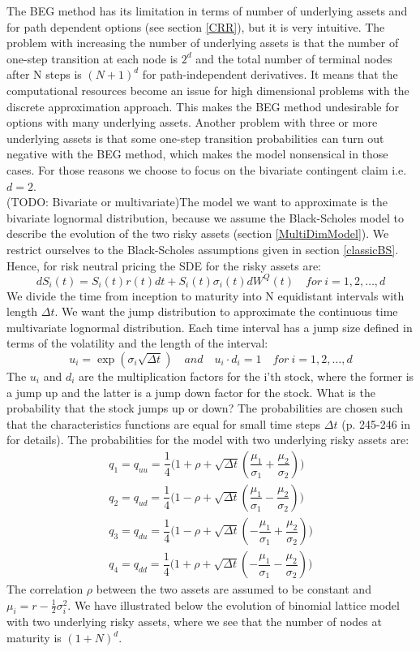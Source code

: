 The BEG method has its limitation in terms of number of underlying assets and for path dependent options (see section \ref{CRR}), but it is very intuitive. The problem with increasing the number of underlying assets is that the number of one-step transition at each node is $2^d$ and the total number of terminal nodes after N steps is $(N+1)^d$ for path-independent derivatives. It means that the computational resources become an issue for high dimensional problems with the discrete approximation approach. This makes the BEG method undesirable for options with many underlying assets. Another problem with three or more underlying assets is that some one-step transition probabilities can turn out negative with the BEG method, which makes the model nonsensical in those cases. For those reasons we choose to focus on the bivariate contingent claim i.e. $d=2$. \\

(TODO: Bivariate or multivariate)The model we want to approximate is the bivariate lognormal distribution, because we assume the Black-Scholes model to describe the evolution of the two risky assets (section \ref{MultiDimModel}). We restrict ourselves to the Black-Scholes assumptions given in section \ref{classicBS}. Hence, for risk neutral pricing the SDE for the risky assets are:
$$dS_i(t)=S_i(t)r(t)dt+S_i(t)\sigma_i(t)dW^Q(t) \quad for \ i=1,2,\ldots,d$$
We divide the time from inception to maturity into N equidistant intervals with length $\Delta t$. We want the jump distribution to approximate the continuous time multivariate lognormal distribution. Each time interval has a jump size defined in terms of the volatility and the length of the interval:
$$u_i=\exp(\sigma_i \sqrt{\Delta t}) \quad and \quad u_i \cdot d_i = 1 \quad for \ i=1,2,\ldots,d $$
The $u_i$ and $d_i$ are the multiplication factors for the i'th stock, where the former is a jump up and the latter is a jump down factor for the stock. What is the probability that the stock jumps up or down? The probabilities are chosen such that the characteristics functions are equal for small time steps $\Delta t$ (p. 245-246 in \parencite{BEG} for details). The probabilities for the model with two underlying risky assets are:
\begin{equation}
\begin{split}
q_1=q_{uu}=\dfrac{1}{4}\bigg( 1+\rho + \sqrt{\Delta t}(\dfrac{\mu_1}{\sigma_1} + \dfrac{\mu_2}{\sigma_2}) \bigg)\\
q_2=q_{ud}=\dfrac{1}{4}\bigg( 1-\rho + \sqrt{\Delta t}(\dfrac{\mu_1}{\sigma_1} - \dfrac{\mu_2}{\sigma_2}) \bigg)\\
q_3=q_{du}=\dfrac{1}{4}\bigg( 1-\rho + \sqrt{\Delta t}(-\dfrac{\mu_1}{\sigma_1} + \dfrac{\mu_2}{\sigma_2}) \bigg)\\
q_4=q_{dd}=\dfrac{1}{4}\bigg( 1+\rho + \sqrt{\Delta t}(-\dfrac{\mu_1}{\sigma_1} - \dfrac{\mu_2}{\sigma_2}) \bigg)
\end{split}
\end{equation} 
The correlation $\rho$ between the two assets are assumed to be constant and $\mu_i=r-\frac{1}{2}\sigma_i^2$. We have illustrated below the evolution of binomial lattice model with two underlying risky assets, where we see that the number of nodes at maturity is $(1+N)^d$. 


